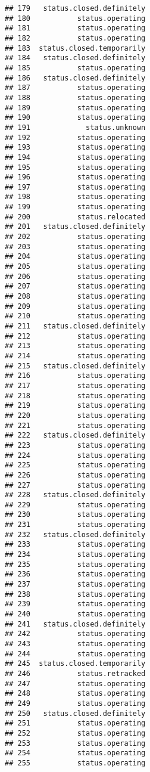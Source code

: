 \documentclass[
]{article}
\begin{document}
\begin{verbatim}
## 179   status.closed.definitely
## 180           status.operating
## 181           status.operating
## 182           status.operating
## 183  status.closed.temporarily
## 184   status.closed.definitely
## 185           status.operating
## 186   status.closed.definitely
## 187           status.operating
## 188           status.operating
## 189           status.operating
## 190           status.operating
## 191             status.unknown
## 192           status.operating
## 193           status.operating
## 194           status.operating
## 195           status.operating
## 196           status.operating
## 197           status.operating
## 198           status.operating
## 199           status.operating
## 200           status.relocated
## 201   status.closed.definitely
## 202           status.operating
## 203           status.operating
## 204           status.operating
## 205           status.operating
## 206           status.operating
## 207           status.operating
## 208           status.operating
## 209           status.operating
## 210           status.operating
## 211   status.closed.definitely
## 212           status.operating
## 213           status.operating
## 214           status.operating
## 215   status.closed.definitely
## 216           status.operating
## 217           status.operating
## 218           status.operating
## 219           status.operating
## 220           status.operating
## 221           status.operating
## 222   status.closed.definitely
## 223           status.operating
## 224           status.operating
## 225           status.operating
## 226           status.operating
## 227           status.operating
## 228   status.closed.definitely
## 229           status.operating
## 230           status.operating
## 231           status.operating
## 232   status.closed.definitely
## 233           status.operating
## 234           status.operating
## 235           status.operating
## 236           status.operating
## 237           status.operating
## 238           status.operating
## 239           status.operating
## 240           status.operating
## 241   status.closed.definitely
## 242           status.operating
## 243           status.operating
## 244           status.operating
## 245  status.closed.temporarily
## 246           status.retracked
## 247           status.operating
## 248           status.operating
## 249           status.operating
## 250   status.closed.definitely
## 251           status.operating
## 252           status.operating
## 253           status.operating
## 254           status.operating
## 255           status.operating

\end{verbatim}
\end{document}
